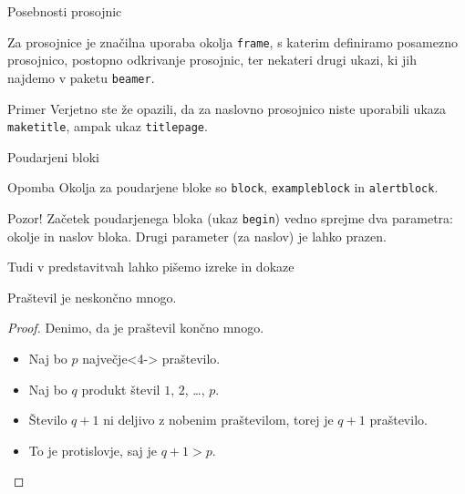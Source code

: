 \begin{frame}{Posebnosti prosojnic}

	Za prosojnice je značilna uporaba okolja \texttt{frame},
	s katerim definiramo posamezno prosojnico,
	\pause
	postopno odkrivanje prosojnic,
	\pause
	ter nekateri drugi ukazi, ki jih najdemo v paketu \texttt{beamer}.
	\pause
	\begin{exampleblock}{Primer}
		Verjetno ste že opazili, da za naslovno prosojnico niste uporabili
		ukaza \texttt{maketitle}, ampak ukaz \texttt{titlepage}.
	\end{exampleblock}
\end{frame}

\begin{frame}{Poudarjeni bloki}
	\begin{block}{Opomba}
		Okolja za poudarjene bloke so \texttt{block}, \texttt{exampleblock} in \texttt{alertblock}.
	\end{block}
	\begin{block}{\color{orange}Pozor!}
		Začetek poudarjenega bloka (ukaz \texttt{begin}) vedno sprejme 
		dva parametra: okolje in naslov bloka.
		Drugi parameter (za naslov) je lahko prazen. 
	\end{block}

\end{frame}

\begin{frame}{Tudi v predstavitvah lahko pišemo izreke in dokaze}

	\begin{izrek}
	   Praštevil je neskončno mnogo.
	\end{izrek}
	\begin{proof}
	   Denimo, da je praštevil končno mnogo.
		\begin{itemize}[<+->]
			\item<1-> Naj bo $p$ \alert{največje}<4-> praštevilo.  
			\item<2-> Naj bo $q$ produkt števil $1$, $2$, \ldots, $p$.
			\item<3-> Število $q+1$ ni deljivo z nobenim praštevilom, torej je $q+1$ praštevilo.
			\item<4-> To je protislovje, saj je $q+1>p$. \qedhere
	   \end{itemize}
	\end{proof}
 \end{frame}
 